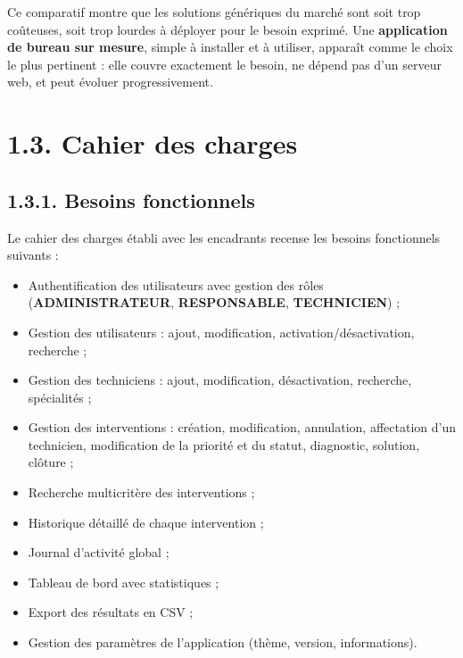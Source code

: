 \documentclass[11pt,a4paper]{report}
\begin{document}
Ce comparatif montre que les solutions génériques du marché sont soit trop coûteuses, soit trop lourdes à déployer pour le besoin exprimé. Une \textbf{application de bureau sur mesure}, simple à installer et à utiliser, apparaît comme le choix le plus pertinent : elle couvre exactement le besoin, ne dépend pas d'un serveur web, et peut évoluer progressivement.
\section*{1.3. Cahier des charges}
\subsection*{1.3.1. Besoins fonctionnels}

Le cahier des charges établi avec les encadrants recense les besoins fonctionnels suivants :
\begin{itemize}
  \item Authentification des utilisateurs avec gestion des rôles (\textbf{ADMINISTRATEUR}, \textbf{RESPONSABLE}, \textbf{TECHNICIEN}) ;
  \item Gestion des utilisateurs : ajout, modification, activation/désactivation, recherche ;
  \item Gestion des techniciens : ajout, modification, désactivation, recherche, spécialités ;
  \item Gestion des interventions : création, modification, annulation, affectation d'un technicien, modification de la priorité et du statut, diagnostic, solution, clôture ;
  \item Recherche multicritère des interventions ;
  \item Historique détaillé de chaque intervention ;
  \item Journal d'activité global ;
  \item Tableau de bord avec statistiques ;
  \item Export des résultats en CSV ;
  \item Gestion des paramètres de l'application (thème, version, informations).
\end{itemize}
\end{document}

